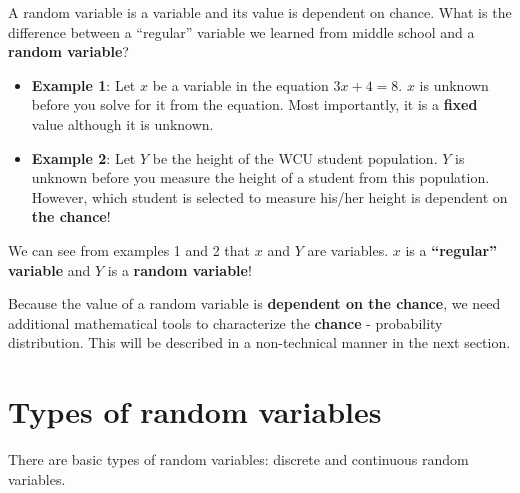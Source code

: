 \documentclass[
]{book}
\begin{document}
A random variable is a variable and its value is dependent on chance. What is the difference between a ``regular'' variable we learned from middle school and a \textbf{random variable}?

\begin{itemize}
\item
  \textbf{Example 1}: Let \(x\) be a variable in the equation \(3x +4 = 8\). \(x\) is unknown before you solve for it from the equation. Most importantly, it is a \textbf{fixed} value although it is unknown.
\item
  \textbf{Example 2}: Let \(Y\) be the height of the WCU student population. \(Y\) is unknown before you measure the height of a student from this population. However, which student is selected to measure his/her height is dependent on \textbf{the chance}!
\end{itemize}

We can see from examples 1 and 2 that \(x\) and \(Y\) are variables. \(x\) is a \textbf{``regular'' variable} and \(Y\) is a \textbf{random variable}!

Because the value of a random variable is \textbf{dependent on the chance}, we need additional mathematical tools to characterize the \textbf{chance} - probability distribution. This will be described in a non-technical manner in the next section.

\hypertarget{types-of-random-variables}{%
\section{Types of random variables}\label{types-of-random-variables}}

There are basic types of random variables: discrete and continuous random variables.
\end{document}
